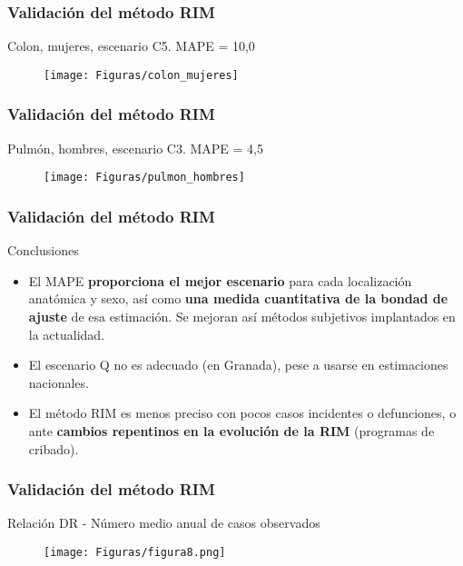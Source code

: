 \documentclass{beamer}
\begin{document}
\begin{frame}\frametitle{Validación del método RIM}

Colon, mujeres, escenario C5. MAPE = 10,0
\begin{figure}
	\centering
	\texttt{[image: Figuras/colon\_mujeres]}
\end{figure}

\end{frame}


\begin{frame}\frametitle{Validación del método RIM}

Pulmón, hombres, escenario C3. MAPE = 4,5
\begin{figure}
	\centering
	\texttt{[image: Figuras/pulmon\_hombres]}
\end{figure}

\end{frame}


\begin{frame}\frametitle{Validación del método RIM}

	\begin{block}{Conclusiones}
		\begin{itemize}
			\item El MAPE \textbf{proporciona el mejor escenario} para cada localización anatómica y sexo, así como \textbf{una medida cuantitativa de la bondad de ajuste} de esa estimación. Se mejoran así métodos subjetivos implantados en la actualidad.\\[2ex]
			\item El escenario Q no es adecuado (en Granada), pese a usarse en estimaciones nacionales.\\[2ex]
			\item El método RIM es menos preciso con pocos casos incidentes o defunciones, o ante \textbf{cambios repentinos en la evolución de la RIM} (programas de cribado).
		\end{itemize}
	\end{block}

\end{frame}


\begin{frame}\frametitle{Validación del método RIM}

\begin{block}{Relación DR - Número medio anual de casos observados}
	\begin{figure}
		\centering
		\texttt{[image: Figuras/figura8.png]}
	\end{figure}
\end{block}

\end{frame}
\end{document}
